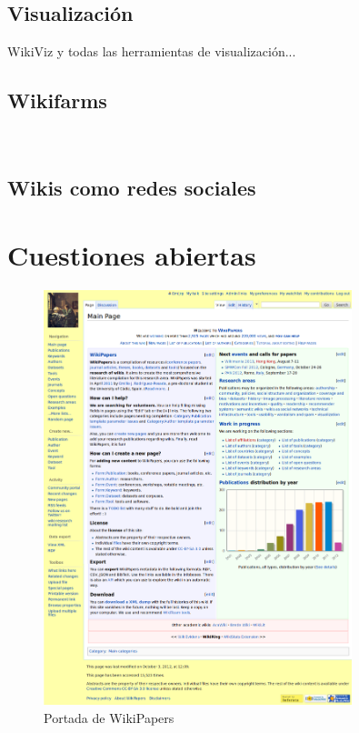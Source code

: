 \documentclass[11pt,onecolumn]{article}
\begin{document}
\subsection{Visualización}

WikiViz y todas las herramientas de visualización...


\subsection{Wikifarms}

~\citep{kittur2010}

\subsection{Wikis como redes sociales}


\section{Cuestiones abiertas}


\begin{figure}[htb]
\centering
\includegraphics[width=0.8\textwidth]{wpfull.png}
\caption{Portada de WikiPapers}
\label{fig:wpfull}
\end{figure}
\end{document}
